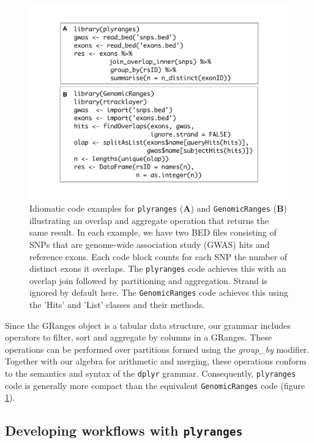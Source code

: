 \documentclass[]{article}
\begin{document}
\begin{figure}
\includegraphics[width=\textwidth]{diagrams/code-comparison.pdf}
\caption{Idiomatic code examples for \texttt{plyranges} (\textbf{A}) and 
\texttt{GenomicRanges} (\textbf{B}) illustrating an overlap and aggregate 
operation that returns the same result. 
In each example, we have two BED files consisting of SNPs that are
genome-wide association study (GWAS) hits and reference exons. Each code block
counts for each SNP the number of distinct exons it overlaps. The 
\texttt{plyranges} code achieves this with an overlap join followed by partitioning
and aggregation. Strand is ignored by default here. 
The \texttt{GenomicRanges} code achieves this using the 'Hits' and 'List' 
classes and their methods.}
\label{fig:code}
\end{figure}

Since the GRanges object is a tabular data structure, our grammar
includes operators to filter, sort and aggregate by columns in a
GRanges. These operations can be performed over partitions formed using
the \emph{group\_by} modifier. Together with our algebra for arithmetic
and merging, these operations conform to the semantics and syntax of the
\texttt{dplyr} grammar. Consequently, \texttt{plyranges} code is
generally more compact than the equivalent \texttt{GenomicRanges} code
(figure \ref{fig:code}).

\subsection{\texorpdfstring{Developing workflows with
\texttt{plyranges}}{Developing workflows with plyranges}}\label{developing-workflows-with-plyranges}
\end{document}
